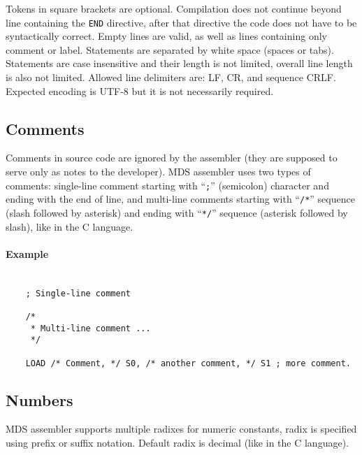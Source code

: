         Tokens in square brackets are optional. Compilation does not continue beyond line containing the \texttt{END} directive, after that directive the code does not have to be syntactically correct. Empty lines are valid, as well as lines containing only comment or label. Statements are separated by white space (spaces or tabs). Statements are case insensitive and their length is not limited, overall line length is also not limited. Allowed line delimiters are: LF, CR, and sequence CRLF. Expected encoding is UTF-8 but it is not necessarily required.

    \subsection{Comments}
        Comments in source code are ignored by the assembler (they are supposed to serve only as notes to the developer). MDS assembler uses two types of comments: single-line comment starting with ``\texttt{;}'' (semicolon) character and ending with the end of line, and multi-line comments starting with ``\texttt{/*}'' sequence (slash followed by asterisk) and ending with ``\texttt{*/}'' sequence (asterisk followed by slash), like in the C language.

        \paragraph{Example}~\\
            \verb'    ; Single-line comment'\\
            \verb'    '\\
            \verb'    /*'\\
            \verb'     * Multi-line comment ...'\\
            \verb'     */'\\
            \verb'    '\\
            \verb'    LOAD /* Comment, */ S0, /* another comment, */ S1 ; more comment.'

    \clearpage
    \subsection{Numbers}
        MDS assembler supports multiple radixes for numeric constants, radix is specified using prefix or suffix notation. Default radix is decimal (like in the C language).


